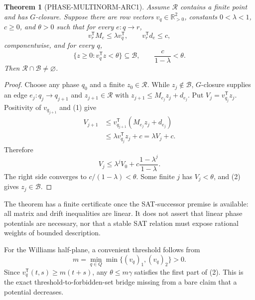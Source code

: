 \documentclass[11pt]{article}
\newtheorem{theorem}{Theorem}
\newcommand{\R}{\mathcal R}
\newcommand{\B}{\mathcal B}
\begin{document}
\begin{theorem}[PHASE-MULTINORM-ARC1]
Assume \(\R\) contains a finite point and has \(G\)-closure.  Suppose there
are row vectors \(v_q\in\mathbb R_{>0}^2\), constants
\(0<\lambda<1\), \(c\ge0\), and \(\theta>0\) such that for every
\(e:q\to r\),
\[
 v_r^{\mathsf T}M_e\le\lambda v_q^{\mathsf T},
 \qquad v_r^{\mathsf T}d_e\le c,
 \tag{1}
\]
componentwise, and for every \(q\),
\[
 \{z\ge0:v_q^{\mathsf T}z<\theta\}\subseteq\B,
 \qquad \frac{c}{1-\lambda}<\theta.
 \tag{2}
\]
Then \(\R\cap\B\ne\varnothing\).
\end{theorem}
\begin{proof}
Choose any phase \(q_0\) and a finite \(z_0\in\R\).  While
\(z_j\notin\B\), \(G\)-closure supplies an edge
\(e_j:q_j\to q_{j+1}\) and \(z_{j+1}\in\R\) with
\(z_{j+1}\le M_{e_j}z_j+d_{e_j}\).  Put
\(V_j=v_{q_j}^{\mathsf T}z_j\).  Positivity of \(v_{q_{j+1}}\) and (1) give
\[
\begin{aligned}
V_{j+1}
&\le v_{q_{j+1}}^{\mathsf T}(M_{e_j}z_j+d_{e_j})\\
&\le\lambda v_{q_j}^{\mathsf T}z_j+c
 =\lambda V_j+c.
\end{aligned}
\]
Therefore
\[
 V_j\le\lambda^jV_0+c\frac{1-\lambda^j}{1-\lambda}.
\]
The right side converges to \(c/(1-\lambda)<\theta\).  Some finite \(j\)
has \(V_j<\theta\), and (2) gives \(z_j\in\B\).
\end{proof}

The theorem has a finite certificate once the SAT-successor premise is
available: all matrix and drift inequalities are linear.  It does not assert
that linear phase potentials are necessary, nor that a stable SAT relation
must expose rational weights of bounded description.

For the Williams half-plane, a convenient threshold follows from
\[
 m=\min_{q\in Q}\min\{(v_q)_1,(v_q)_2\}>0.
\]
Since \(v_q^{\mathsf T}(t,s)\ge m(t+s)\), any
\(\theta\le m\gamma\) satisfies the first part of (2).  This is the exact
threshold-to-forbidden-set bridge missing from a bare claim that a potential
decreases.
\end{document}

